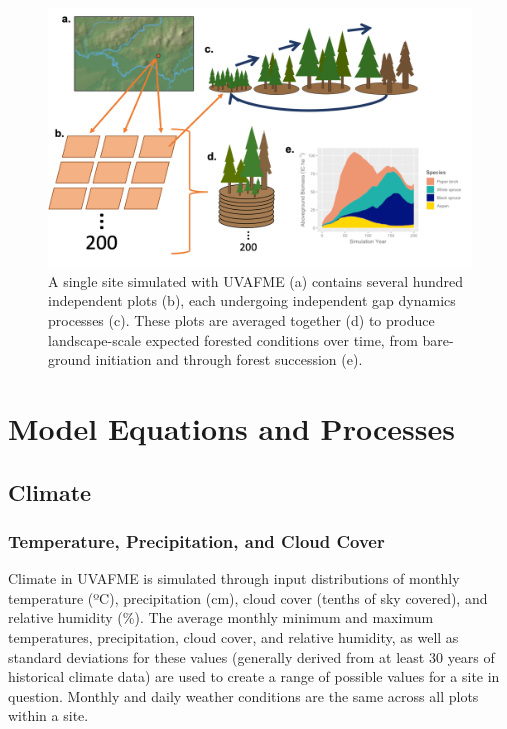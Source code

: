 \documentclass[a4paper, 12pt] {report}
\begin{document}
\begin{figure}
  \includegraphics[width=\linewidth]{Figures/Scales_full.png}
  \caption{A single site simulated with UVAFME (a) contains several hundred independent plots (b), each undergoing independent gap dynamics processes (c). These plots are averaged together (d) to produce landscape-scale expected forested conditions over time, from bare-ground initiation and through forest succession (e).}
  \label{fig:scales}
\end{figure}

\chapter{Model Equations and Processes} \label{chap:modelproc}

\section{Climate} \label{climate}

\subsection{Temperature, Precipitation, and Cloud Cover} \label{weather}

Climate in UVAFME is simulated through input distributions of monthly temperature (ºC), precipitation (cm), cloud cover (tenths of sky covered), and relative humidity (\%). The average monthly minimum and maximum temperatures, precipitation, cloud cover, and relative humidity, as well as standard deviations for these values (generally derived from at least 30 years of historical climate data) are used to create a range of possible values for a site in question. Monthly and daily weather conditions are the same across all plots within a site.
\end{document}
